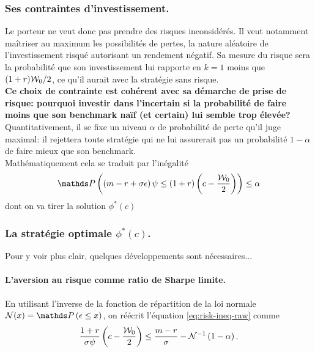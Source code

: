 \documentclass{article}
\numberwithin{equation}{section}
\begin{document}
\subsubsection{Ses contraintes d'investissement.}

Le porteur ne veut donc pas prendre des risques inconsidérés. Il veut notamment maîtriser au maximum les possibilités de pertes, la nature aléatoire de l'investissement risqué autorisant un rendement négatif. Sa mesure du risque sera la probabilité que son investissement lui rapporte en $k = 1$ moins que $(1 + r)\mathcal{W}_0/2$, ce qu'il aurait avec la stratégie sans risque.\\

\textbf{\color{awesomePurple}Ce choix de contrainte est cohérent avec sa démarche de prise de risque: pourquoi investir dans l'incertain si la probabilité de faire moins que son benchmark naïf (et certain) lui semble trop élevée?}\\

Quantitativement, il se fixe un niveau $\alpha$ de probabilité de perte qu'il juge maximal: il rejettera toute stratégie qui ne lui assurerait pas un probabilité $1 - \alpha$ de faire mieux que son benchmark.\\

Mathématiquement cela se traduit par l'inégalité
\begin{equation}\label{eq:risk-ineq-raw}
\mathds P\left( \left(m - r + \sigma\epsilon\right)\psi \leq \left(1 + r\right)\left( c - \frac{\W_0}{2} \right) \right) \leq \alpha
\end{equation}
dont on va tirer la solution $\phi^*(c)$

\subsubsection{La stratégie optimale $\phi^*(c)$.}

Pour y voir plus clair, quelques développements sont nécessaires...\\

\paragraph{L'aversion au risque comme ratio de Sharpe limite.} En utilisant l'inverse de la fonction de répartition de la loi normale $\N(x) = \mathds P\left(\epsilon\leq x\right)$, on réécrit l'équation \eqref{eq:risk-ineq-raw} comme
\begin{equation}\label{eq:risk-ineq}
\frac{1+r}{\sigma\psi}\left( c - \frac{\mathcal{W}_0}{2} \right) \leq \frac{m - r}{\sigma} - \mathcal{N}^{-1}\left( 1 - \alpha\right).
\end{equation}
\end{document}
